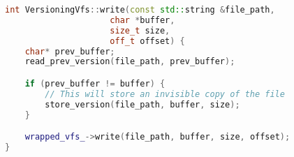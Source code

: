 \begin{lstlisting}[language=c++, basicstyle=\ttfamily\small]
int VersioningVfs::write(const std::string &file_path,
                     char *buffer,
                     size_t size,
                     off_t offset) {
    char* prev_buffer;
    read_prev_version(file_path, prev_buffer);

    if (prev_buffer != buffer) {
        // This will store an invisible copy of the file
        store_version(file_path, buffer, size);
    }

    wrapped_vfs_->write(file_path, buffer, size, offset);
}
\end{lstlisting}